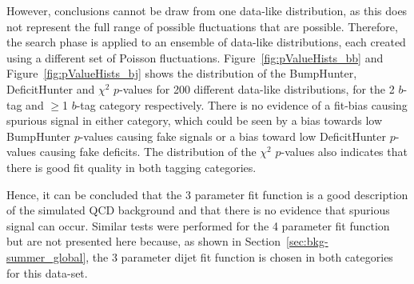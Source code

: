 However, conclusions cannot be draw from one data-like distribution,
as this does not represent the full range of possible fluctuations that are possible.
Therefore, the search phase is applied to an ensemble of data-like distributions,
each created using a different set of Poisson fluctuations.
Figure~\ref{fig:pValueHists_bb} and Figure~\ref{fig:pValueHists_bj} shows the distribution of
the BumpHunter, DeficitHunter and $\chi^{2}$ \mbox{$p$-value}s for 200 different data-like distributions,
for the 2 $b$-tag and $\geq$1 $b$-tag category respectively.
There is no evidence of a fit-bias causing spurious signal in either category,
which could be seen by a bias towards low BumpHunter \mbox{$p$-value}s causing fake signals
or a bias toward low DeficitHunter \mbox{$p$-value}s causing fake deficits.
The distribution of the $\chi^{2}$ \mbox{$p$-value}s also indicates that there is good fit quality in both tagging categories.

Hence, it can be concluded that the 3 parameter fit function is a good description of the simulated QCD background
and that there is no evidence that spurious signal can occur.
Similar tests were performed for the 4 parameter fit function but are not presented here because,
as shown in Section~\ref{sec:bkg-summer_global},
the 3 parameter dijet fit function is chosen in both categories for this data-set.

